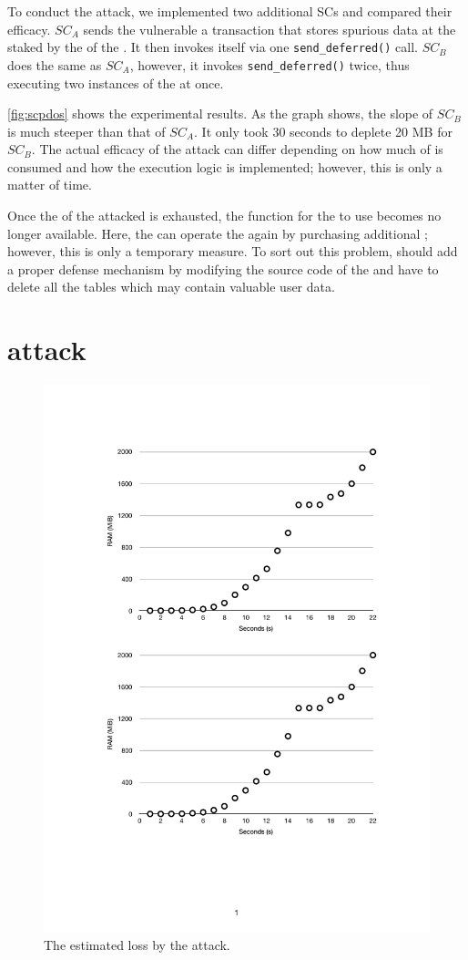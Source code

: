 To conduct the attack, we implemented two additional SCs and compared their
efficacy.
%
$SC_{A}$ sends the vulnerable \SC a transaction that stores spurious data at the
\ram staked by the \SCP of the \SC. It then invokes itself via one
\texttt{send\_deferred()} call. $SC_{B}$ does the same as $SC_{A}$, however, it
invokes \texttt{send\_deferred()} twice, thus executing two instances of the \SC
at once.

\autoref{fig:scpdos} shows the experimental results. As the graph shows, the
slope of $SC_{B}$ is much steeper than that of $SC_{A}$. It only took 30 seconds
to deplete 20 MB for $SC_{B}$.
%
The actual efficacy of the \SCPDOS attack can differ depending on how much
of \ram is consumed and how the execution logic is implemented; however, this is
only a matter of time.

Once the \ram of the attacked \SCP is exhausted, the function for the \SC to use
\ram becomes no longer available.
%
Here, the \SCP can operate the \SC again by purchasing additional \ram; however,
this is only a temporary measure.
%
To sort out this problem, \SCPs should add a proper defense mechanism by
modifying the source code of the \SC and have to delete all the \ram tables
which may contain valuable user data.


\section{\TOCTOU attack}

\label{label_toctou}
\begin{figure}[!t] %
\centering
  \includegraphics[width=0.8\linewidth]{figures/RAMSOMWARE_EVAL.pdf}
  \caption{The estimated \ram loss by the \TOCTOU attack.}
  \label{fig:toctou}
\end{figure}

